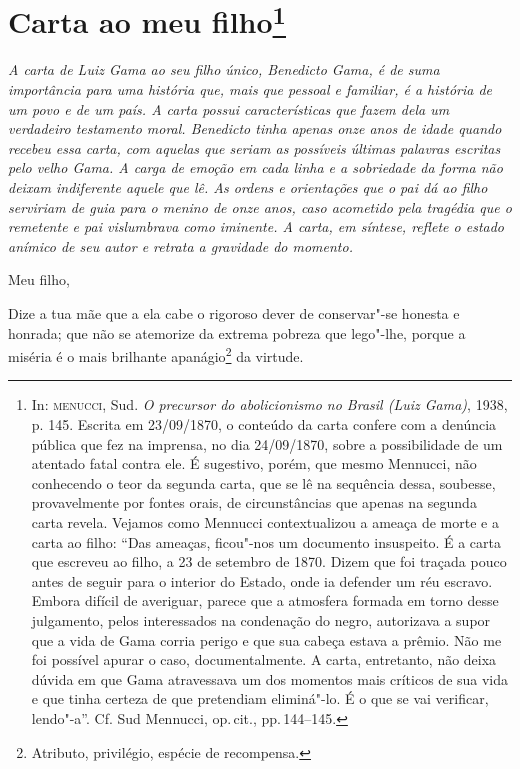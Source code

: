 \chapter{Carta ao meu filho\footnote[*]{
  In: \textsc{menucci}, Sud. \emph{O precursor do abolicionismo no Brasil (Luiz
  Gama)}, 1938, p. 145. Escrita em 23/09/1870, o conteúdo da carta confere com
  a denúncia pública que fez na imprensa, no dia 24/09/1870, sobre a
  possibilidade de um atentado fatal contra ele. É sugestivo, porém, que
  mesmo Mennucci, não conhecendo o teor da segunda carta, que se lê na
  sequência dessa, soubesse, provavelmente por fontes orais, de
  circunstâncias que apenas na segunda carta revela. Vejamos como
  Mennucci contextualizou a ameaça de morte e a carta ao filho: ``Das
  ameaças, ficou"-nos um documento insuspeito. É a carta que escreveu ao
  filho, a 23 de setembro de 1870. Dizem que foi traçada pouco antes de
  seguir para o interior do Estado, onde ia defender um réu escravo.
  Embora difícil de averiguar, parece que a atmosfera formada em torno
  desse julgamento, pelos interessados na condenação do negro,
  autorizava a supor que a vida de Gama corria perigo e que sua cabeça
  estava a prêmio. Não me foi possível apurar o caso, documentalmente. A
  carta, entretanto, não deixa dúvida em que Gama atravessava um dos
  momentos mais críticos de sua vida e que tinha certeza de que
  pretendiam eliminá"-lo. É o que se vai verificar, lendo"-a''. Cf. Sud
  Mennucci, op.\,cit., pp.\,144--145.}}

\begin{flushleft}
{\footnotesize\itshape
A carta de Luiz Gama ao seu filho único, Benedicto Gama, é de suma
importância para uma história que, mais que pessoal e familiar, é a
história de um povo e de um país. A carta possui características que
fazem dela um verdadeiro testamento moral. Benedicto tinha apenas onze
anos de idade quando recebeu essa carta, com aquelas que seriam as
possíveis últimas palavras escritas pelo velho Gama. A carga de emoção
em cada linha e a sobriedade da forma não deixam indiferente aquele que
lê. As ordens e orientações que o
pai dá ao filho serviriam de guia para o
menino de onze anos, caso acometido pela tragédia que o remetente e pai
vislumbrava como iminente. A carta, em síntese, reflete o estado anímico
de seu autor e retrata a gravidade do momento.}
\end{flushleft}

Meu filho,

Dize a tua mãe que a ela cabe o rigoroso dever de conservar"-se honesta e
honrada; que não se atemorize da extrema pobreza que lego"-lhe, porque a
miséria é o mais brilhante apanágio\footnote{Atributo, privilégio,
  espécie de recompensa.} da virtude.

